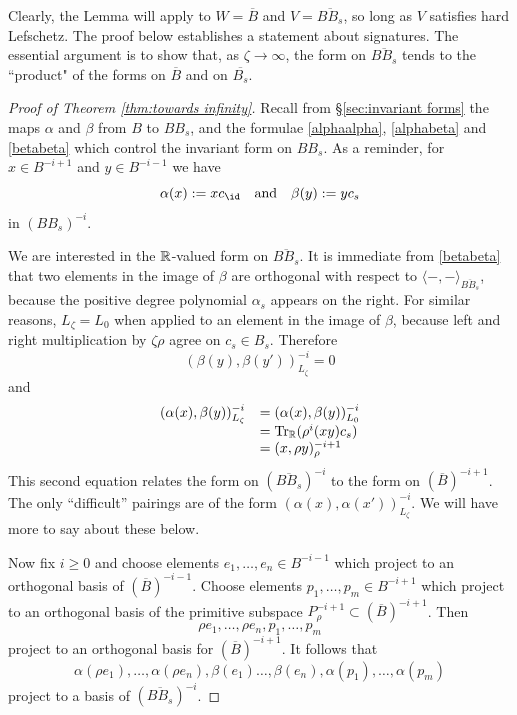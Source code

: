 \documentclass[11pt]{amsart}
\numberwithin{equation}{section}
\def\a{\alpha}
\def\b{\beta}
\def\z{\zeta}
\DeclareMathOperator{\Tr}{Tr}
\def\ov{\overline}
\def\to{\rightarrow}
\theoremstyle{definition}
\theoremstyle{remark}
\begin{document}
Clearly, the Lemma will apply to $W = \ov{B}$ and $V = \ov{BB_s}$, so long as $V$ satisfies hard Lefschetz. The
proof below establishes a statement about signatures. The essential argument is to show that, as $\z \to \infty$, the form on $\ov{BB_s}$ tends to the ``product" of the forms on $\ov{B}$ and on $\ov{B_s}$.

\begin{proof}[Proof of Theorem \ref{thm:towards infinity}] 
Recall from \S\ref{sec:invariant forms} the maps $\a$ and $\b$ from $B$ to $B B_s$, and the formulae
\eqref{alphaalpha}, \eqref{alphabeta} and \eqref{betabeta} which control the invariant form on $B B_s$. As a reminder, for $x \in B^{{-i}+1}$ and $y \in B^{{-i}-1}$ we have \[ \a(x) :=
xc_{\id} \quad \text{and} \quad \b(y) := yc_s \] in $(BB_s)^{-i}$.

We are interested in the ${\mathbb{R}}$-valued form on $\ov{BB_s}$. It is immediate from \eqref{betabeta} that two elements in the image of $\b$ are orthogonal with respect to $\langle -,-
\rangle_{\ov{BB_s}}$, because the positive degree polynomial $\a_s$ appears on the right. For similar reasons, $L_\z = L_0$ when applied to an element in the image of $\b$, because left and
right multiplication by $\z \rho$ agree on $c_s \in B_s$. Therefore
\begin{equation} \label{eq:betabeta} ( \beta(y), \beta(y') )^{-i}_{L_\z} = 0 \end{equation}
and
\begin{gather} \label{eq:alphabeta}
\begin{array}{rl}
	( \alpha(x), \beta(y) )^{-i}_{L_\z} & = ( \alpha(x), \beta(y) )^{-i}_{L_0}
	\\ & = \Tr_{\RM}(\rho^i (xy) c_s) \\ & = ( x, \rho y)^{-i+1}_\rho
\end{array}
\end{gather}
This second equation relates the form on $(\ov{BB_s})^{-i}$ to the
form on $(\ov{B})^{-i+1}$. The only ``difficult'' pairings are of the
form $( \a(x), \a(x') )^{-i}_{L_\z}$. We will have more to say about
these below. 

Now fix $i \ge 0$ and choose elements $e_1, \ldots, e_n \in B^{-i-1}$ which project to an orthogonal basis of $(\ov{B})^{-i-1}$. Choose elements $p_1,\ldots,p_m \in B^{-i+1}$ which project to an orthogonal basis
of the primitive subspace $P^{-i+1}_\rho \subset (\ov{B})^{-i+1}$. Then \[\rho e_1, \dots, \rho e_n,p_1, \dots, p_m \] project to an orthogonal basis for $(\ov{B})^{{-i}+1}$. It follows that \[
\alpha(\rho e_1), \dots, \alpha(\rho e_n), \beta(e_1) \dots, \beta(e_n), \alpha(p_1), \dots, \alpha(p_m) \] project to a basis of $(\ov{BB_s})^{-i}$.


\end{proof}
\end{document}
